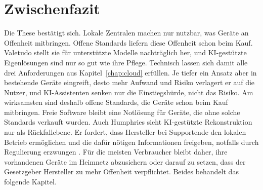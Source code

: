 \section{Zwischenfazit}\label{sec:lokal-zwischenfazit}

Die These bestätigt sich. Lokale Zentralen machen nur nutzbar, was Geräte an
Offenheit mitbringen. Offene Standards liefern diese Offenheit schon beim Kauf.
Valetudo stellt sie für unterstützte Modelle nachträglich her, und
\acrshort{KI}-gestützte Eigenlösungen sind nur so gut wie ihre Pflege. Technisch
lassen sich damit alle drei Anforderungen aus Kapitel~\ref{chap:cloud}
erfüllen. Je tiefer ein Ansatz aber in bestehende Geräte eingreift, desto mehr
Aufwand und Risiko verlagert er auf die Nutzer, und \acrshort{KI}-Assistenten
senken nur die Einstiegshürde, nicht das Risiko. Am wirksamsten sind deshalb
offene Standards, die Geräte schon beim Kauf mitbringen. Freie Software bleibt
eine Notlösung für Geräte, die ohne solche Standards verkauft wurden. Auch Humphries
sieht \acrshort{KI}-gestützte Rekonstruktion nur als Rückfallebene. Er fordert,
dass Hersteller bei Supportende den lokalen Betrieb ermöglichen und die dafür
nötigen Informationen freigeben, notfalls durch Regulierung erzwungen
\cite[S.~5\,f.]{humphries:2026}. Für die meisten Verbraucher bleibt daher,
ihre vorhandenen Geräte im Heimnetz abzusichern oder darauf zu setzen, dass
der Gesetzgeber Hersteller zu mehr Offenheit verpflichtet. Beides behandelt das folgende Kapitel.
